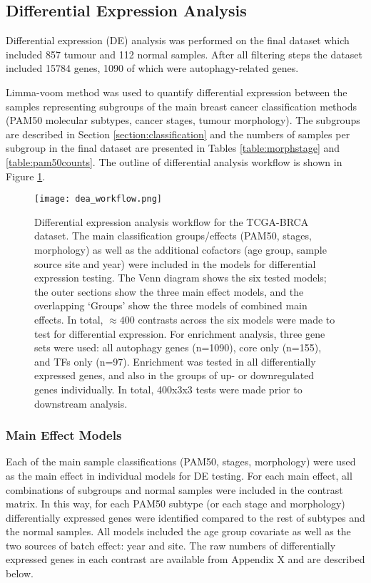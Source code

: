     \subsection{Differential Expression Analysis}
    
    Differential expression (DE) analysis was performed on the final dataset which included 857 tumour and 112 normal samples. After all filtering steps the dataset included 15784 genes, 1090 of which were autophagy-related genes. 

    Limma-voom method was used to quantify differential expression between the samples representing subgroups of the main breast cancer classification methods (PAM50 molecular subtypes, cancer stages, tumour morphology). The subgroups are described in Section \ref{section:classification} and the numbers of samples per subgroup in the final dataset are presented in Tables \ref{table:morphstage} and \ref{table:pam50counts}. The outline of differential analysis workflow is shown in Figure \ref{fig:deaworkflow}. 

       
            \begin{figure}[!h]
            \centering
            \texttt{[image: dea\_workflow.png]} 
            \caption[Differential Expression Analysis workflow]{Differential expression analysis workflow for the TCGA-BRCA dataset. The main classification groups/effects (PAM50, stages, morphology) as well as the additional cofactors (age group, sample source site and year) were included in the models for differential expression testing. The Venn diagram shows the six tested models; the outer sections show the three main effect models, and the overlapping ‘Groups' show the three models of combined main effects. In total, $\approx 400$ contrasts across the six models were made to test for differential expression. For enrichment analysis, three gene sets were used: all autophagy genes (n=1090), core only (n=155), and TFs only (n=97). Enrichment was tested in all differentially expressed genes, and also in the groups of up- or downregulated genes individually. In total, 400x3x3 tests were made prior to downstream analysis.  }
            \label{fig:deaworkflow}
            \end{figure}

        \subsubsection{Main Effect Models}
        
        Each of the main sample classifications (PAM50, stages, morphology) were used as the main effect in individual models for DE testing. For each main effect, all combinations of subgroups and normal samples were included in the contrast matrix. In this way, for each PAM50 subtype (or each stage and morphology) differentially expressed genes were identified compared to the rest of subtypes and the normal samples. All models included the age group covariate as well as the two sources of batch effect: year and site. The raw numbers of differentially expressed genes in each contrast are available from Appendix X and are described below.

